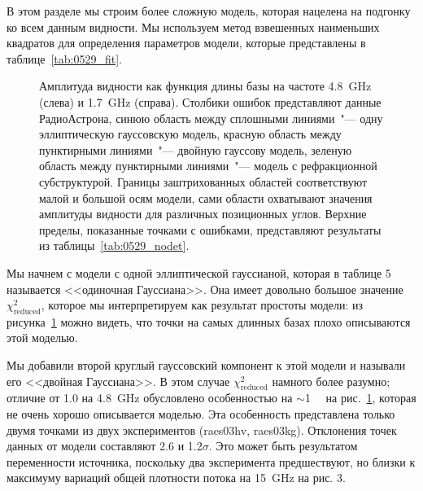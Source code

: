 В этом разделе мы строим более сложную модель, которая нацелена на подгонку ко всем данным
видности. Мы используем метод взвешенных наименьших квадратов для определения параметров модели,
которые представлены в таблице~\ref{tab:0529_fit}.

\begin{figure}[]
\caption{Амплитуда видности как функция длины базы на частоте \SI{4.8}{\GHz} (слева) и
\SI{1.7}{\GHz} (справа). Столбики ошибок представляют данные РадиоАстрона, синюю область между
сплошными линиями~"--- одну эллиптическую гауссовскую модель, красную область между пунктирными
линиями~"--- двойную гауссову модель, зеленую область между пунктирными линиями~"--- модель с
рефракционной субструктурой. Границы заштрихованных областей соответствуют малой и большой осям
модели, сами области охватывают значения амплитуды видности для различных позиционных углов.
Верхние пределы, показанные точками с ошибками, представляют результаты из
таблицы~\ref{tab:0529_nodet}.}
\label{fig:0529_1dplot}
\end{figure}

Мы начнем с модели с одной эллиптической гауссианой, которая в таблице 5 называется
<<одиночная Гауссиана>>. Она имеет довольно большое значение $\chi^2_\text{reduced}$, которое мы
интерпретируем как результат простоты модели: из рисунка~\ref{fig:0529_1dplot} можно видеть, что
точки на самых длинных базах плохо описываются этой моделью.

Мы добавили второй круглый гауссовский компонент к этой модели и называли его <<двойная
Гауссиана>>. В этом случае $\chi^2_\text{reduced}$ намного более разумно; отличие от 1.0 на
\SI{4.8}{\GHz} обусловлено особенностью на $\sim$\SI{1}{\giga\la} на рис.~\ref{fig:0529_1dplot},
которая не очень хорошо описывается моделью. Эта особенность представлена только двумя точками из
двух экспериментов (raes03hv, raes03kg). Отклонения точек данных от модели составляют 2.6 и
1.2$\sigma$. Это может быть результатом переменности источника, поскольку два эксперимента
предшествуют, но близки к максимуму вариаций общей плотности потока на \SI{15}{\GHz} на рис. 3.

